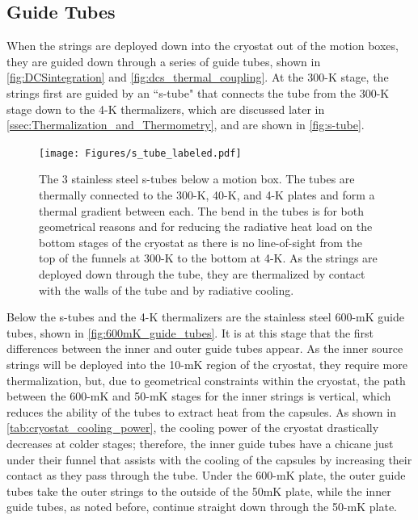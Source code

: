 \subsection*{Guide Tubes}
\label{ssec:Guide Tubes}
When the strings are deployed down into the cryostat out of the motion boxes, they are guided down through a series of guide tubes, shown in \autoref{fig:DCSintegration} and \autoref{fig:dcs_thermal_coupling}.
At the 300-K stage, the strings first are guided by an ``s-tube" that connects the tube from the 300-K stage down to the 4-K thermalizers, which are discussed later in \autoref{ssec:Thermalization_and_Thermometry}, and are shown in \autoref{fig:s-tube}.
\begin{figure}[htbp]
    \centering
    \texttt{[image: Figures/s\_tube\_labeled.pdf]}
    \caption[The 3 stainless steel s-tubes below a motion box.]
    {The 3 stainless steel s-tubes below a motion box.
    The tubes are thermally connected to the 300-K, 40-K, and 4-K plates and form a thermal gradient between each.
    The bend in the tubes is for both geometrical reasons and for reducing the radiative heat load on the bottom stages of the cryostat as there is no line-of-sight from the top of the funnels at 300-K to the bottom at 4-K.
    As the strings are deployed down through the tube, they are thermalized by contact with the walls of the tube and by radiative cooling.}
    \label{fig:s-tube}
\end{figure}
Below the s-tubes and the 4-K thermalizers are the stainless steel 600-mK guide tubes, shown in \autoref{fig:600mK_guide_tubes}.
It is at this stage that the first differences between the inner and outer guide tubes appear.
As the inner source strings will be deployed into the 10-mK region of the cryostat, they require more thermalization, but, due to geometrical constraints within the cryostat, the path between the 600-mK and 50-mK stages for the inner strings is vertical, which reduces the ability of the tubes to extract heat from the capsules.
As shown in \autoref{tab:cryostat_cooling_power}, the cooling power of the cryostat drastically decreases at colder stages; therefore, the inner guide tubes have a chicane just under their funnel that assists with the cooling of the capsules by increasing their contact as they pass through the tube.
Under the 600-mK plate, the outer guide tubes take the outer strings to the outside of the 50mK plate, while the inner guide tubes, as noted before, continue straight down through the 50-mK plate.

